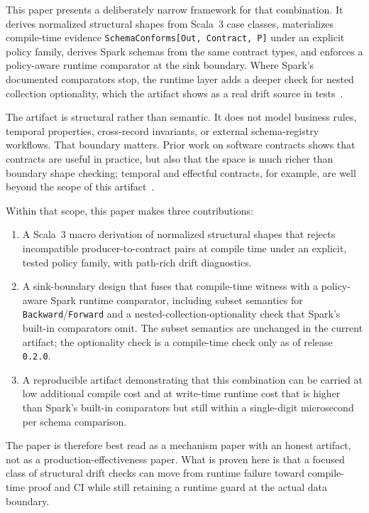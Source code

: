 This paper presents a deliberately narrow framework for that combination. It derives normalized structural shapes from Scala~3 case classes, materializes compile-time evidence \texttt{SchemaConforms[Out, Contract, P]} under an explicit policy family, derives Spark schemas from the same contract types, and enforces a policy-aware runtime comparator at the sink boundary. Where Spark's documented comparators stop, the runtime layer adds a deeper check for nested collection optionality, which the artifact shows as a real drift source in tests~\cite{spark_datatype}.\carriermoved

The artifact is structural rather than semantic. It does not model business rules, temporal properties, cross-record invariants, or external schema-registry workflows. That boundary matters. Prior work on software contracts shows that contracts are useful in practice, but also that the space is much richer than boundary shape checking; temporal and effectful contracts, for example, are well beyond the scope of this artifact~\cite{contracts_in_practice,trace_contracts,effectful_software_contracts}.

Within that scope, this paper makes three contributions:

\begin{enumerate}[leftmargin=1.5em]
  \item A Scala~3 macro derivation of normalized structural shapes that rejects incompatible producer-to-contract pairs at compile time under an explicit, tested policy family, with path-rich drift diagnostics.
  \item A sink-boundary design that fuses that compile-time witness with a policy-aware Spark runtime comparator, including subset semantics for \texttt{Backward}/\texttt{Forward} and a nested-collection-optionality check that Spark's built-in comparators omit. The subset semantics are unchanged in the current artifact; the optionality check is a compile-time check only as of release \texttt{0.2.0}.
  \item A reproducible artifact demonstrating that this combination can be carried at low additional compile cost and at write-time runtime cost that is higher than Spark's built-in comparators but still within a single-digit microsecond per schema comparison.
\end{enumerate}

The paper is therefore best read as a mechanism paper with an honest artifact, not as a production-effectiveness paper. What is proven here is that a focused class of structural drift checks can move from runtime failure toward compile-time proof and CI while still retaining a runtime guard at the actual data boundary.
